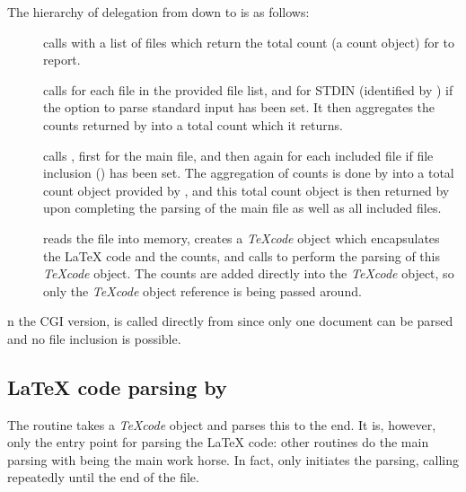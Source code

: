 \documentclass{article}
\newcommand\Obj[1]{\textsl{#1}}
\def\CGI#1\CGIend{#1} %
\def\CGIend{}
\begin{document}
The hierarchy of delegation from  down to  is as follows:

\begin{description}

\item[] calls  with a list of files which return the total count (a count object) for  to report.

\item[] calls  for each file in the provided file list, and for STDIN (identified by ) if the option to parse standard input has been set. It then aggregates the counts returned by  into a total count which it returns.

\item[] calls , first for the main file, and then again for each included file if file inclusion () has been set. The aggregation of counts is done by  into a total count object provided by , and this total count object is then returned by  upon completing the parsing of the main file as well as all included files.

\item[] reads the file into memory, creates a \Obj{TeXcode} object which encapsulates the \LaTeX{} code and the counts, and calls  to perform the parsing of this \Obj{TeXcode} object. The counts are added directly into the \Obj{TeXcode} object, so only the \Obj{TeXcode} object reference is being passed around.

\end{description}

\CGI
In the CGI version,  is called directly from  since only one document can be parsed and no file inclusion is possible. 
\CGIend


\subsection{\LaTeX{} code parsing by }

The  routine takes a \Obj{TeXcode} object and parses this to the end. It is, however, only the entry point for parsing the \LaTeX{} code: other routines do the main parsing with  being the main work horse. In fact,  only initiates the parsing, calling  repeatedly until the end of the file.
\end{document}
